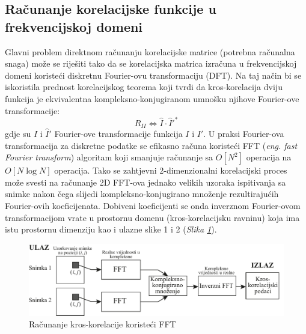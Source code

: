 \subsection{Računanje korelacijske funkcije u frekvencijskoj domeni}
Glavni problem direktnom računanju korelacijske matrice (potrebna računalna snaga) može se riješiti tako da se korelacijska matrica izračuna u frekvencijskoj domeni koristeći diskretnu Fourier-ovu transformaciju (DFT). Na taj način bi se iskoristila prednost  korelacijskog teorema koji tvrdi da kros-korelacija dviju funkcija je ekvivalentna kompleksno-konjugiranom umnošku njihove Fourier-ove transformacije:
\begin{equation}
	R_{II} \iff \hat{I}\cdot \hat{I}'^*
	\label{eqn:2.5}
\end{equation}
gdje su $\hat{I}$ i $\hat{I}'$ Fourier-ove transformacije funkcija $I$ i $I'$. U praksi
Fourier-ova transformacija za diskretne podatke se efikasno računa koristeći FFT (\textit{eng. fast Fourier transform}) algoritam koji smanjuje računanje sa $O[N^2]$ operacija na $O[N\log N]$ operacija. Tako se zahtjevni 2-dimenzionalni korelacijski proces može svesti na računanje 2D FFT-ova jednako velikih uzoraka ispitivanja sa snimke nakon čega slijedi kompleksno-konjugirano množenje rezultirajućih Fourier-ovih koeficijenata. Dobiveni koeficijenti se onda inverznom Fourier-ovom transformacijom vrate u prostornu domenu (kros-korelacijsku ravninu) koja ima istu prostornu dimenziju kao i ulazne slike 1 i 2 (\textit{Slika \ref{sl:2.10}}).
\begin{figure}[h]  
	\centering
	\includegraphics[width=16.5cm]{./2_DPIV/2_10FFT_postupak.pdf} 
	\caption{Računanje kros-korelacije koristeći FFT \cite{raffel2018_book}}
	\label{sl:2.10}
\end{figure}
\par
